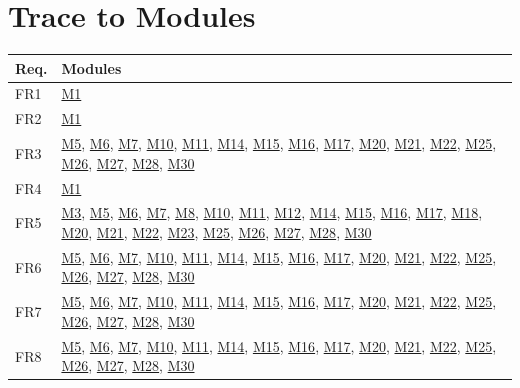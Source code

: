 \documentclass[12pt, titlepage]{article}
\begin{document}
\section{Trace to Modules}		
\begin{table}[H]
\centering
\begin{tabular}{p{} p{}}
\toprule
\textbf{Req.} & \textbf{Modules}\\
\midrule
FR1 & \hyperref[m1]{M1}\\
FR2 & \hyperref[m1]{M1}\\ 
FR3 & \hyperref[m5]{M5}, \hyperref[m6]{M6}, \hyperref[m7]{M7}, \hyperref[m10]{M10}, \hyperref[m11]{M11}, \hyperref[m14]{M14}, \hyperref[m15]{M15}, \hyperref[m16]{M16}, \hyperref[m17]{M17}, \hyperref[m20]{M20}, \hyperref[m21]{M21}, \hyperref[m22]{M22}, \hyperref[m25]{M25}, \hyperref[m26]{M26}, \hyperref[m27]{M27}, \hyperref[m28]{M28}, \hyperref[m30]{M30} \\
FR4 & \hyperref[m1]{M1}\\
FR5 & \hyperref[m3]{M3}, \hyperref[m5]{M5}, \hyperref[m6]{M6}, \hyperref[m7]{M7}, \hyperref[m8]{M8}, \hyperref[m10]{M10}, \hyperref[m11]{M11}, \hyperref[m12]{M12}, \hyperref[m14]{M14}, \hyperref[m15]{M15}, \hyperref[m16]{M16}, \hyperref[m17]{M17}, \hyperref[m18]{M18}, \hyperref[m20]{M20}, \hyperref[m21]{M21}, \hyperref[m22]{M22}, \hyperref[m23]{M23}, \hyperref[m25]{M25}, \hyperref[m26]{M26}, \hyperref[m27]{M27}, \hyperref[m28]{M28}, \hyperref[m30]{M30}\\
FR6 & \hyperref[m5]{M5}, \hyperref[m6]{M6}, \hyperref[m7]{M7}, \hyperref[m10]{M10}, \hyperref[m11]{M11}, \hyperref[m14]{M14}, \hyperref[m15]{M15}, \hyperref[m16]{M16}, \hyperref[m17]{M17}, \hyperref[m20]{M20}, \hyperref[m21]{M21}, \hyperref[m22]{M22}, \hyperref[m25]{M25}, \hyperref[m26]{M26}, \hyperref[m27]{M27}, \hyperref[m28]{M28}, \hyperref[m30]{M30}\\
FR7 & \hyperref[m5]{M5}, \hyperref[m6]{M6}, \hyperref[m7]{M7}, \hyperref[m10]{M10}, \hyperref[m11]{M11}, \hyperref[m14]{M14}, \hyperref[m15]{M15}, \hyperref[m16]{M16}, \hyperref[m17]{M17}, \hyperref[m20]{M20}, \hyperref[m21]{M21}, \hyperref[m22]{M22}, \hyperref[m25]{M25}, \hyperref[m26]{M26}, \hyperref[m27]{M27}, \hyperref[m28]{M28}, \hyperref[m30]{M30}\\
FR8 & \hyperref[m5]{M5}, \hyperref[m6]{M6}, \hyperref[m7]{M7}, \hyperref[m10]{M10}, \hyperref[m11]{M11}, \hyperref[m14]{M14}, \hyperref[m15]{M15}, \hyperref[m16]{M16}, \hyperref[m17]{M17}, \hyperref[m20]{M20}, \hyperref[m21]{M21}, \hyperref[m22]{M22}, \hyperref[m25]{M25}, \hyperref[m26]{M26}, \hyperref[m27]{M27}, \hyperref[m28]{M28}, \hyperref[m30]{M30}\\

\end{tabular}
\end{table}
\end{document}
